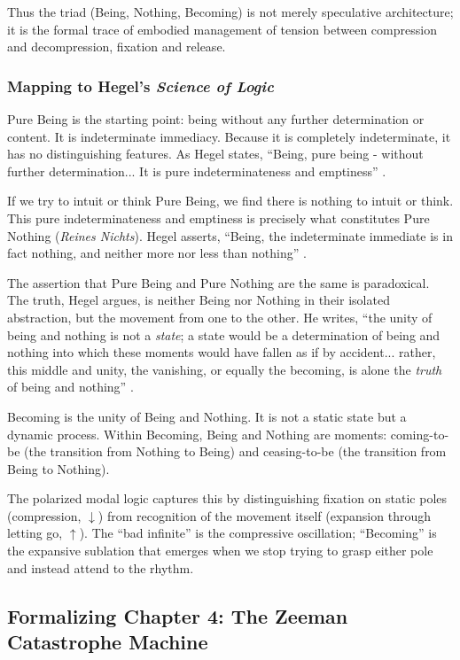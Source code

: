 \documentclass[12pt]{book}
\begin{document}
Thus the triad (Being, Nothing, Becoming) is not merely speculative architecture; it is the formal trace of embodied management of tension between compression and decompression, fixation and release.

\subsubsection{Mapping to Hegel's \textit{Science of Logic}}

Pure Being is the starting point: being without any further determination or content. It is indeterminate immediacy. Because it is completely indeterminate, it has no distinguishing features. As Hegel states, ``Being, pure being - without further determination... It is pure indeterminateness and emptiness'' \parencite[59]{Hegel:2014aa}.

If we try to intuit or think Pure Being, we find there is nothing to intuit or think. This pure indeterminateness and emptiness is precisely what constitutes Pure Nothing (\textit{Reines Nichts}). Hegel asserts, ``Being, the indeterminate immediate is in fact nothing, and neither more nor less than nothing'' \parencite[59]{Hegel:2014aa}.

The assertion that Pure Being and Pure Nothing are the same is paradoxical. The truth, Hegel argues, is neither Being nor Nothing in their isolated abstraction, but the movement from one to the other. He writes, ``the unity of being and nothing is not a \textit{state}; a state would be a determination of being and nothing into which these moments would have fallen as if by accident... rather, this middle and unity, the vanishing, or equally the becoming, is alone the \textit{truth} of being and nothing'' \parencite[216]{Hegel:2014aa}.

Becoming is the unity of Being and Nothing. It is not a static state but a dynamic process. Within Becoming, Being and Nothing are moments: coming-to-be (the transition from Nothing to Being) and ceasing-to-be (the transition from Being to Nothing).

The polarized modal logic captures this by distinguishing fixation on static poles (compression, $\downarrow$) from recognition of the movement itself (expansion through letting go, $\uparrow$). The ``bad infinite'' is the compressive oscillation; ``Becoming'' is the expansive sublation that emerges when we stop trying to grasp either pole and instead attend to the rhythm.

\subsection{Formalizing Chapter 4: The Zeeman Catastrophe Machine}
\end{document}
